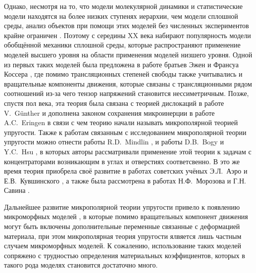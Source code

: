 Однако, несмотря на то, что модели молекулярной динамики и статистические модели находятся на более низких ступенях иерархии, чем модели сплошной среды, анализ объектов при помощи этих моделей без численных экспериментов крайне ограничен \cite{MDExperiment}. Поэтому с середины XX века набирают популярность модели обобщённой механики сплошной среды, которые распространяют применение моделей высшего уровня на области применения моделей низшего уровня. Одной из первых таких моделей была предложена в работе братьев Эжен и Франсуа Коссера \cite{Cosserat}, где помимо трансляционных степеней свободы также учитывались и вращательные компоненты движения, которые связаны с трансляционными рядом соотношений из-за чего тензор напряжений становится нессиметричным. Позже, спустя пол века, эта теория была связана с теорией дислокаций в работе V.~G{\"u}nther \cite{CosseratAndDislocation} и дополнена законом сохранения микроинерции в работе A.C.~Eringen \cite{Eringen2, Eringen3} в связи с чем теорию начали называть микрополярной теорией упругости. Также к работам связанным с исследованием микрополярной теории упругости можно отнести работы R.D.~Mindlin \cite{Mindlin1, Mindlin2, Mindlin3}, и работы D.B.~Bogy \cite{Bogy} и Y.C.~Hsu \cite{Hsu}, в которых авторы рассматривали применение этой теории к задачам с концентраторами возникающим в углах и отверстиях соответсвенно. В это же время теория приобрела своё развитие в работах советских учёных Э.Л.~Аэро и Е.В.~Кувшинского \cite{Aero1,Aero2}, а также была рассмотрена в работах Н.Ф.~Морозова \cite{Morozov} и Г.Н. Савина \cite{Savin}.

Дальнейшее развитие микрополярной теории упругости привело к появлению микроморфных моделей \cite{Eringen4, Micromorph1, Micromorph2}, в которые помимо вращательных компонент движения могут быть включены дополнительные переменные связанные с деформацией материала, при этом микрополярная теория упругости ялвяется лишь частным случаем микроморфных моделей. К сожалению, использование таких моделей сопряжено с трудностью определения материальных коэффициентов, которых в такого рода моделях становится достаточно много.

